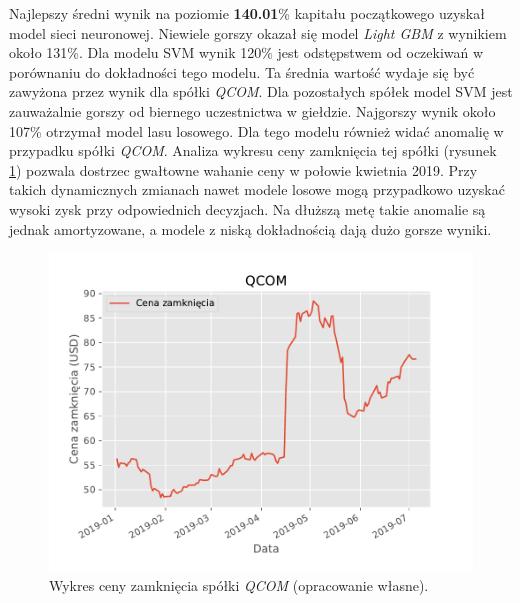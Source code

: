 \documentclass[a4paper, twoside, 11pt, openright]{article}
\begin{document}
Najlepszy średni wynik na poziomie \textbf{140.01}\% kapitału początkowego uzyskał model sieci neuronowej. Niewiele gorszy okazał się model \textit{Light GBM} z wynikiem około 131\%. Dla modelu SVM wynik 120\% jest odstępstwem od oczekiwań w porównaniu do dokładności tego modelu. Ta średnia wartość wydaje się być zawyżona przez wynik dla spółki \textit{QCOM}. Dla pozostałych spółek model SVM jest zauważalnie gorszy od biernego uczestnictwa w giełdzie. Najgorszy wynik około 107\% otrzymał model lasu losowego. Dla tego modelu również widać anomalię w przypadku spółki \textit{QCOM}. Analiza wykresu ceny zamknięcia tej spółki (rysunek \ref{img:qcom_adj_close}) pozwala dostrzec gwałtowne wahanie ceny w połowie kwietnia 2019. Przy takich dynamicznych zmianach nawet modele losowe mogą przypadkowo uzyskać wysoki zysk przy odpowiednich decyzjach. Na dłuższą metę takie anomalie są jednak amortyzowane, a modele z niską dokładnością dają dużo gorsze wyniki.

\begin{figure}[H]
\centering \includegraphics[scale=1]{img/QCOM_adj_close.pdf}
\caption{Wykres ceny zamknięcia spółki \textit{QCOM} (opracowanie własne).}
\label{img:qcom_adj_close}
\end{figure}
\end{document}
